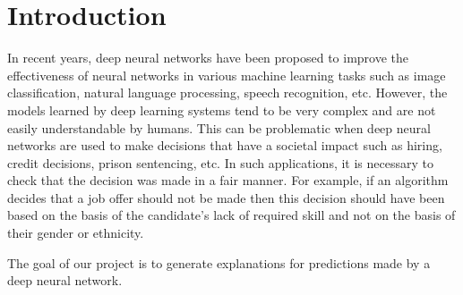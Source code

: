 \section{Introduction}

In recent years, deep neural networks have been proposed to improve the effectiveness of neural networks in various machine learning tasks such as image classification, natural language processing, speech recognition, etc. However, the models learned by deep learning systems tend to be very complex and are not easily understandable by humans. This can be problematic when deep neural networks are used to make decisions that have a societal impact such as hiring, credit decisions, prison sentencing, etc. In such applications, it is necessary to check that the decision was made in a fair manner. For example, if an algorithm decides that a job offer should not be made then this decision should have been based on the basis of the candidate's lack of required skill and not on the basis of their gender or ethnicity.

The goal of our project is to generate explanations for predictions made by a deep neural network.